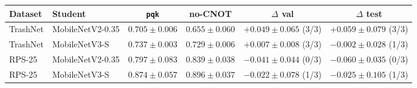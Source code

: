 \begin{tabular}{@{}llcccc@{}}
\toprule
Dataset & Student & \texttt{pqk} & no-CNOT & $\Delta$ val & $\Delta$ test \\
\midrule
TrashNet & MobileNetV2-0.35 & $0.705\pm0.006$ & $0.655\pm0.060$ & $+0.049\pm0.065$ (3/3) & $+0.059\pm0.079$ (3/3) \\
TrashNet & MobileNetV3-S & $0.737\pm0.003$ & $0.729\pm0.006$ & $+0.007\pm0.008$ (3/3) & $-0.002\pm0.028$ (1/3) \\
RPS-25 & MobileNetV2-0.35 & $0.797\pm0.083$ & $0.839\pm0.038$ & $-0.041\pm0.044$ (0/3) & $-0.060\pm0.035$ (0/3) \\
RPS-25 & MobileNetV3-S & $0.874\pm0.057$ & $0.896\pm0.037$ & $-0.022\pm0.078$ (1/3) & $-0.025\pm0.105$ (1/3) \\
\bottomrule
\end{tabular}
